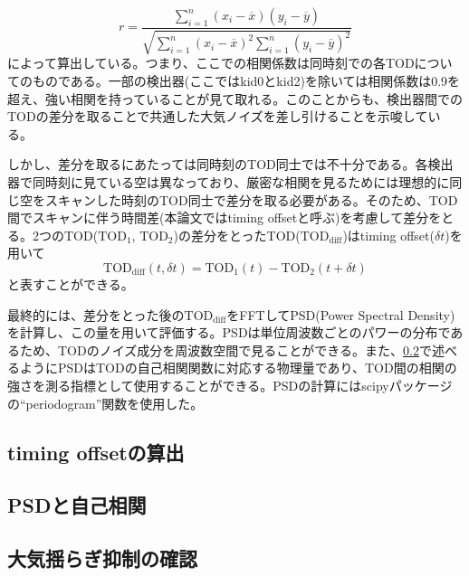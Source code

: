 \begin{equation}
  r = \frac{\displaystyle\sum_{i=1}^{n}(x_{i}-\overline{x})(y_{i}-\overline{y})}{\sqrt{\displaystyle\sum_{i=1}^{n}(x_{i}-\overline{x})^{2}\displaystyle\sum_{i=1}^{n}(y_{i}-\overline{y})^{2}}}
\end{equation}
によって算出している。つまり、ここでの相関係数は同時刻での各TODについてのものである。一部の検出器(ここではkid0とkid2)を除いては相関係数は0.9を超え、強い相関を持っていることが見て取れる。このことからも、検出器間でのTODの差分を取ることで共通した大気ノイズを差し引けることを示唆している。

しかし、差分を取るにあたっては同時刻のTOD同士では不十分である。各検出器で同時刻に見ている空は異なっており、厳密な相関を見るためには理想的に同じ空をスキャンした時刻のTOD同士で差分を取る必要がある。そのため、TOD間でスキャンに伴う時間差(本論文ではtiming offsetと呼ぶ)を考慮して差分をとる。2つのTOD($\mathrm{TOD}_{1}$, $\mathrm{TOD}_{2}$)の差分をとったTOD($\mathrm{TOD}_{\mathrm{diff}}$)はtiming offset($\delta t$)を用いて
\begin{equation}
  \mathrm{TOD}_{\mathrm{diff}}(t,\delta t) = \mathrm{TOD}_{1}(t) - \mathrm{TOD}_{2}(t + \delta t)
\end{equation}
と表すことができる\cite{sueno_doctor}。

最終的には、差分をとった後の$\mathrm{TOD}_{\mathrm{diff}}$をFFTしてPSD(Power Spectral Density)を計算し、この量を用いて評価する。PSDは単位周波数ごとのパワーの分布であるため、TODのノイズ成分を周波数空間で見ることができる。また、\ref{psd_correlation}で述べるようにPSDはTODの自己相関関数に対応する物理量であり、TOD間の相関の強さを測る指標として使用することができる。PSDの計算にはscipyパッケージの``periodogram\cite{periodogram}''関数を使用した。

\subsection{timing offsetの算出}

\subsection{PSDと自己相関}
\label{psd_correlation}

\subsection{大気揺らぎ抑制の確認}
